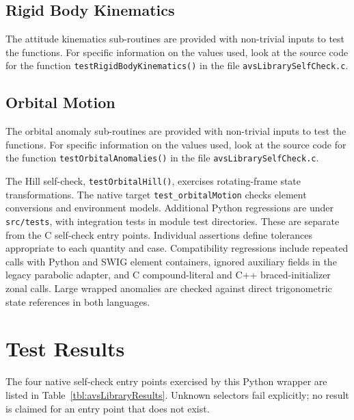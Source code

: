 \subsection{Rigid Body Kinematics}
The attitude kinematics sub-routines are provided with non-trivial inputs to test the functions.   For specific information on the values used, look at the source code for the function {\tt testRigidBodyKinematics()} in the file {\tt avsLibrarySelfCheck.c}.


\subsection{Orbital Motion}
The orbital anomaly sub-routines are provided with non-trivial inputs to test the functions.   For specific information on the values used, look at the source code for the function {\tt testOrbitalAnomalies()} in the file {\tt avsLibrarySelfCheck.c}.

The Hill self-check, {\tt testOrbitalHill()}, exercises rotating-frame state
transformations. The native target {\tt test\_orbitalMotion} checks element
conversions and environment models. Additional Python regressions are under
{\tt src/tests}, with integration tests in module test directories. These are separate from the C self-check entry points. Individual
assertions define tolerances appropriate to each quantity and case.
Compatibility regressions include repeated calls with Python and SWIG element
containers, ignored auxiliary fields in the legacy parabolic adapter, and C
compound-literal and C++ braced-initializer zonal calls. Large wrapped anomalies
are checked against direct trigonometric state references in both languages.

\section{Test Results}
The four native self-check entry points exercised by this Python wrapper are listed in Table~\ref{tbl:avsLibraryResults}. Unknown selectors fail explicitly; no result is claimed for an entry point that does not exist.


